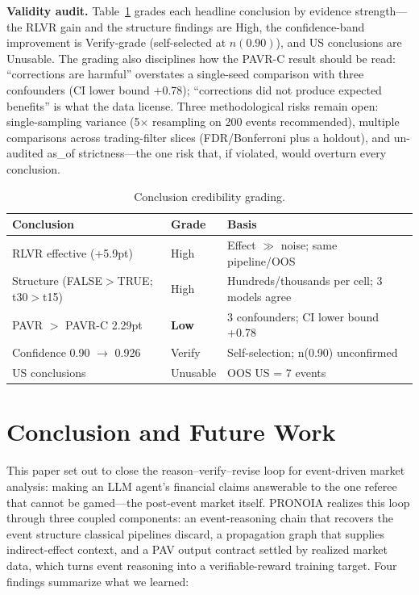 \documentclass[sigconf, anonymous, review]{acmart}
\begin{document}
\textbf{Validity audit.} Table~\ref{tab:audit} grades each headline conclusion by evidence strength---the RLVR gain and the structure findings are High, the confidence-band improvement is Verify-grade (self-selected at $n(0.90)$), and US conclusions are Unusable. The grading also disciplines how the PAVR-C result should be read: ``corrections are harmful'' overstates a single-seed comparison with three confounders (CI lower bound +0.78); ``corrections did not produce expected benefits'' is what the data license. Three methodological risks remain open: single-sampling variance (5$\times$ resampling on 200 events recommended), multiple comparisons across trading-filter slices (FDR/Bonferroni plus a holdout), and un-audited as\_of strictness---the one risk that, if violated, would overturn every conclusion.

\begin{table}[t]
\centering\footnotesize
\caption{Conclusion credibility grading.}
\label{tab:audit}
\setlength{\tabcolsep}{4pt}
\begin{tabular}{@{}p{3.15cm}lp{3.35cm}@{}}
\toprule
Conclusion & Grade & Basis \\
\midrule
RLVR effective (+5.9pt) & High & Effect $\gg$ noise; same pipeline/OOS \\
Structure (FALSE$>$TRUE; t30$>$t15) & High & Hundreds/thousands per cell; 3 models agree \\
PAVR $>$ PAVR-C 2.29pt & \textbf{Low} & 3 confounders; CI lower bound +0.78 \\
Confidence 0.90 $\to$ 0.926 & Verify & Self-selection; n(0.90) unconfirmed \\
US conclusions & Unusable & OOS US = 7 events \\
\bottomrule
\end{tabular}
\end{table}

\section{Conclusion and Future Work}
\label{sec:conclusion}

This paper set out to close the reason--verify--revise loop for event-driven market analysis: making an LLM agent's financial claims answerable to the one referee that cannot be gamed---the post-event market itself. PRONOIA realizes this loop through three coupled components: an event-reasoning chain that recovers the event structure classical pipelines discard, a propagation graph that supplies indirect-effect context, and a PAV output contract settled by realized market data, which turns event reasoning into a verifiable-reward training target. Four findings summarize what we learned:
\end{document}
